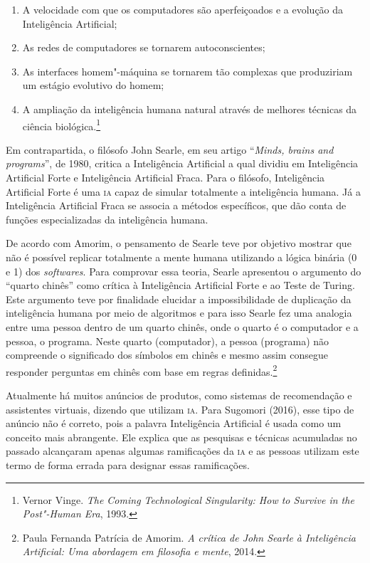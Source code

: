 \begin{enumerate}
\item A velocidade com que os computadores são aperfeiçoados e a evolução da Inteligência Artificial;

\item As redes de computadores se tornarem autoconscientes;

\item As interfaces homem"-máquina se tornarem tão complexas que produziriam um estágio evolutivo do homem;

\item A ampliação da inteligência humana natural através de melhores
técnicas da ciência biológica.\footnote{Vernor Vinge. \textit{The Coming
Technological Singularity: How to Survive in the Post"-Human Era}, 1993.}
\end{enumerate}

Em contrapartida, o filósofo John Searle, em seu artigo ``\textit{Minds,
brains and programs}'', de 1980, critica a Inteligência Artificial a qual dividiu em Inteligência Artificial Forte e
Inteligência Artificial Fraca. Para o filósofo, Inteligência Artificial Forte é uma \textsc{ia} capaz de simular totalmente a inteligência humana. Já a
Inteligência Artificial Fraca se associa a métodos específicos, que dão
conta de funções especializadas da inteligência humana.

De acordo com Amorim, o pensamento de Searle teve por objetivo
mostrar que não é possível replicar totalmente a mente humana utilizando
a lógica binária (0 e 1) dos \textit{softwares}. Para
comprovar essa teoria, Searle apresentou o argumento do ``quarto
chinês'' como crítica à Inteligência Artificial Forte e ao Teste de
Turing. Este argumento teve por finalidade elucidar a impossibilidade de
duplicação da inteligência humana por meio de algoritmos e para isso
Searle fez uma analogia entre uma pessoa dentro de um quarto chinês,
onde o quarto é o computador e a pessoa, o programa. Neste quarto
(computador), a pessoa (programa) não compreende o significado dos
símbolos em chinês e mesmo assim consegue responder perguntas em chinês
com base em regras definidas.\footnote{Paula Fernanda Patrícia de Amorim. \textit{A crítica de John Searle à Inteligência Artificial: Uma abordagem em filosofia e mente}, 2014.}

Atualmente há muitos anúncios de produtos, como sistemas de recomendação
e assistentes virtuais, dizendo que utilizam \textsc{ia}. Para Sugomori (2016),
esse tipo de anúncio não é correto, pois a palavra Inteligência
Artificial é usada como um conceito mais abrangente. Ele explica que as
pesquisas e técnicas acumuladas no passado alcançaram apenas algumas
ramificações da \textsc{ia} e as pessoas utilizam este termo de forma errada para
designar essas ramificações.

